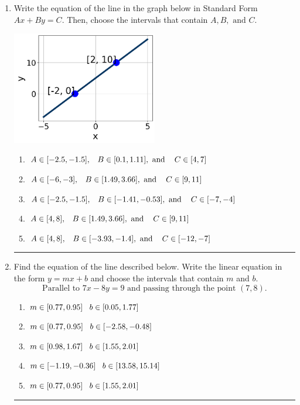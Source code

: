 \documentclass[14pt]{extbook}
\newcommand{\litem}[1]{\item#1\hspace*{-1cm}\rule{\textwidth}{0.4pt}}
\begin{document}
\begin{enumerate}
{\begin{enumerate}[label=\Alph*.]
\end{enumerate} }
\litem{
Write the equation of the line in the graph below in Standard Form $Ax+By=C$. Then, choose the intervals that contain $A, B, \text{ and } C$.
\begin{center}
    \includegraphics[width=0.5\textwidth]{../Figures/linearGraphToStandardCopyC.png}
\end{center}
\begin{enumerate}[label=\Alph*.]
\item \( A \in [-2.5, -1.5], \hspace{3mm} B \in [0.1, 1.11], \text{ and } \hspace{3mm} C \in [4, 7] \)
\item \( A \in [-6, -3], \hspace{3mm} B \in [1.49, 3.66], \text{ and } \hspace{3mm} C \in [9, 11] \)
\item \( A \in [-2.5, -1.5], \hspace{3mm} B \in [-1.41, -0.53], \text{ and } \hspace{3mm} C \in [-7, -4] \)
\item \( A \in [4, 8], \hspace{3mm} B \in [1.49, 3.66], \text{ and } \hspace{3mm} C \in [9, 11] \)
\item \( A \in [4, 8], \hspace{3mm} B \in [-3.93, -1.4], \text{ and } \hspace{3mm} C \in [-12, -7] \)

\end{enumerate} }
\litem{
Find the equation of the line described below. Write the linear equation in the form $ y=mx+b $ and choose the intervals that contain $m$ and $b$.\[ \text{Parallel to } 7 x - 8 y = 9 \text{ and passing through the point } (7, 8). \]\begin{enumerate}[label=\Alph*.]
\item \( m \in [0.77, 0.95] \hspace*{3mm} b \in [0.05, 1.77] \)
\item \( m \in [0.77, 0.95] \hspace*{3mm} b \in [-2.58, -0.48] \)
\item \( m \in [0.98, 1.67] \hspace*{3mm} b \in [1.55, 2.01] \)
\item \( m \in [-1.19, -0.36] \hspace*{3mm} b \in [13.58, 15.14] \)
\item \( m \in [0.77, 0.95] \hspace*{3mm} b \in [1.55, 2.01] \)


\end{enumerate}}
\end{enumerate}
\end{document}
